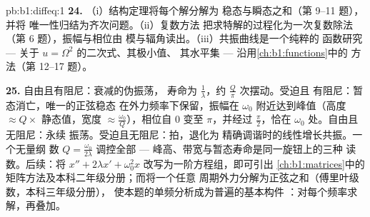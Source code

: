 \begin{solution}{pb:b1:diffeq:1}
\textbf{24.} （i）结构定理将每个解分解为
稳态与瞬态之和（第 9--11 题），并将
唯一性归结为齐次问题。（ii）复数方法
把求特解的过程化为一次复数除法
（第 6 题），振幅与相位由
模与辐角读出。（iii）共振曲线是一个纯粹的
函数研究 --- 关于 $u = \Omega^2$ 的二次式、其极小值、
其水平集 --- 沿用\cref{ch:b1:functions}中的
方法（第 12--17 题）。

\textbf{25.} 自由且有阻尼：衰减的伪振荡，
寿命为 $\frac1\lambda$，约 $\frac Q\pi$ 次摆动。受迫且
有阻尼：暂态消亡，唯一的正弦稳态
在外力频率下保留，振幅在
$\omega_0$ 附近达到峰值（高度 $\approx Q \times$ 静态值，宽度 $\approx
\frac{\omega_0}Q$），相位自 $0$ 变至 $\pi$，并经过
$\frac\pi2$，恰在 $\omega_0$ 处。自由且无阻尼：永续
振荡。受迫且无阻尼：拍，退化为
精确调谐时的线性增长共振。一个无量纲
数 $Q = \frac{\omega_0}{2\lambda}$ 调控全部 ---
峰高、带宽与暂态寿命是同一旋钮上的三种
读数。后续：将 $x'' + 2\lambda x' +
\omega_0^2x$ 改写为一阶方程组，即可引出
\cref{ch:b1:matrices}中的矩阵方法及本科二年级分册；而将一个任意
周期外力分解为正弦之和（傅里叶级数，本科三年级分册），
使本题的单频分析成为普遍的基本构件
：对每个频率求解，再叠加。
\end{solution}
